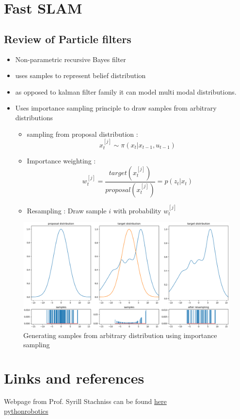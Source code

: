 \documentclass{article}
\begin{document}
\section{Fast SLAM}
\subsection{Review of Particle filters}
\begin{itemize}
        \item Non-parametric recursive Bayes filter
        \item uses samples to represent belief distribution
        \item as opposed to kalman filter family it can model multi modal distributions. 
        \item Uses importance sampling principle to draw samples from arbitrary distributions
            \begin{itemize}
                \item sampling from proposal distribution : 
                    $$x_t^{[j]} \sim \pi(x_t|x_{t-1},u_{t-1})$$
                \item Importance weighting :
                    $$ w_t^{[j]} = \frac{target(x_t^{[j]})}{proposal(x_t^{[j]})} = p(z_t|x_t) $$
                \item Resampling : Draw sample $i$ with probability $w_t^{[j]}$
            \end{itemize}
\end{itemize}
\begin{figure}
    \includegraphics[width = \linewidth]{./importance_sampling.png}
    \caption{Generating samples from arbitrary distribution using importance sampling}
\end{figure}

    
\section{Links and references}
Webpage from  Prof. Syrill Stachniss can be found \href{http://ais.informatik.uni-freiburg.de/teaching/ws13/mapping/}{here}\\
\href{https://pythonrobotics.readthedocs.io}{pythonrobotics}
\end{document}
